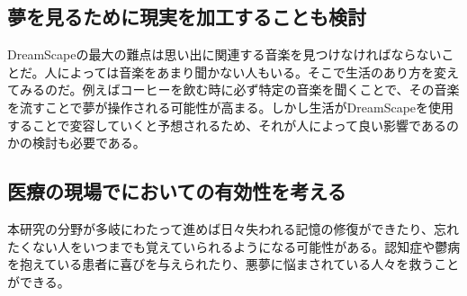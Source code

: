\subsection{夢を見るために現実を加工することも検討}
DreamScapeの最大の難点は思い出に関連する音楽を見つけなければならないことだ。人によっては音楽をあまり聞かない人もいる。そこで生活のあり方を変えてみるのだ。例えばコーヒーを飲む時に必ず特定の音楽を聞くことで、その音楽を流すことで夢が操作される可能性が高まる。しかし生活がDreamScapeを使用することで変容していくと予想されるため、それが人によって良い影響であるのかの検討も必要である。

\subsection{医療の現場でにおいての有効性を考える}
本研究の分野が多岐にわたって進めば日々失われる記憶の修復ができたり、忘れたくない人をいつまでも覚えていられるようになる可能性がある。認知症や鬱病を抱えている患者に喜びを与えられたり、悪夢に悩まされている人々を救うことができる。



